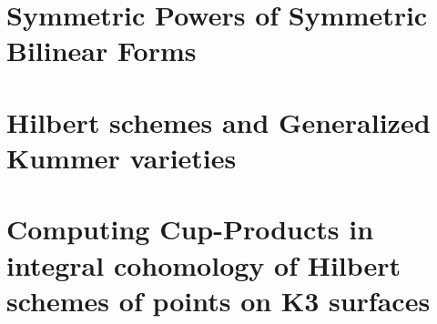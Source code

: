 \documentclass[letter]{article}
\begin{document}
\tableofcontents

\pagebreak
{} 




\part{Symmetric Powers of Symmetric Bilinear Forms}

\newpage
\part{Hilbert schemes and Generalized Kummer varieties}






\label{integralcohomology}





\newpage
\part{Computing Cup-Products in integral cohomology of Hilbert schemes of points on K3 surfaces}



\appendix




\end{document}
